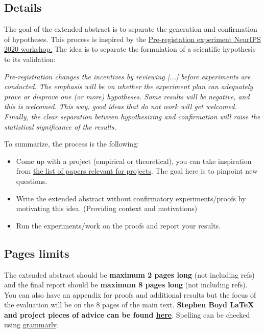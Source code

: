 \documentclass{article}
\begin{document}
\subsection{Details}
The goal of the extended abstract is to separate the generation and confirmation of hypotheses. This process is inspired by the \href{https://preregister.science/}{Pre-registation experiment NeurIPS 2020 workshop.} The idea is to separate the formulation of a scientific hypothesis to its validation: 
\begin{center}
\begin{minipage}{ .9\textwidth}
\emph{Pre-registration changes the incentives by reviewing [...] before experiments are conducted. The emphasis will be on whether the experiment plan can adequately prove or disprove one (or more) hypotheses. Some results will be negative, and this is welcomed. This way, good ideas that do not work will get welcomed. Finally, the clear separation between hypothesizing and confirmation will raise the statistical significance of the results.}
\end{minipage}
\end{center}
To summarize, the process is the following:
\begin{itemize}
    \item Come up with a project (empirical or theoretical), you can take inspiration from \href{https://docs.google.com/spreadsheets/d/1laPRRCjZO7bvG9cEg_juaVNsWXZJkJevuZRRz-otu7c/edit?usp=sharing}{the list of papers relevant for projects}. 
    The goal here is to pinpoint new questions.
    \item Write the extended abstract without confirmatory experiments/proofs by motivating this idea. (Providing context and motivations) 
    \item Run the experiments/work on the proofs and report your results.
\end{itemize}

    
\subsection{Pages limits}

The extended abstract should be \textbf{maximum 2 pages long} (not including refs) and the final report should be \textbf{maximum 8 pages long} (not including refs). You can also have an appendix for proofs and additional results but the focus of the evaluation will be on the 8 pages of the main text.
\textbf{Stephen Boyd LaTeX and project pieces of advice can be found \href{https://youtu.be/Kwli6FkYQYY?t=164}{here}}.  
Spelling can be checked using \href{https://www.grammarly.com/}{grammarly}.
\end{document}
